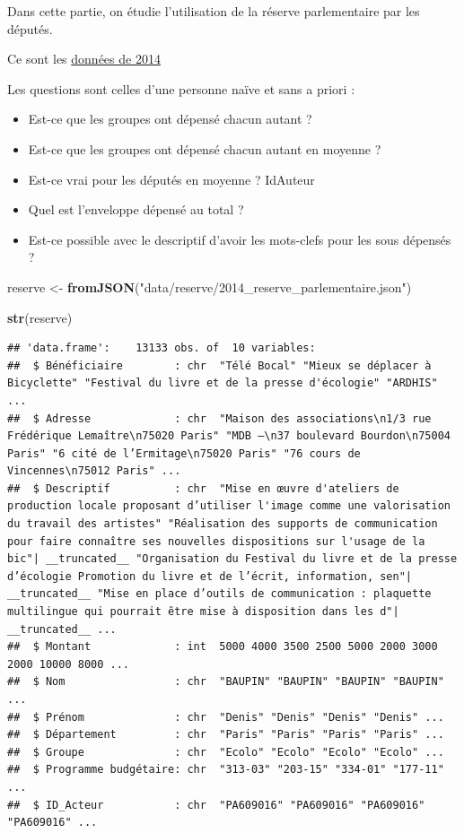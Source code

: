\documentclass[
]{book}
\newenvironment{Shaded}{\begin{snugshade}}{\end{snugshade}}
\newcommand{\FunctionTok}[1]{\textcolor[rgb]{0.13,0.29,0.53}{\textbf{#1}}}
\newcommand{\NormalTok}[1]{#1}
\newcommand{\OtherTok}[1]{\textcolor[rgb]{0.56,0.35,0.01}{#1}}
\newcommand{\StringTok}[1]{\textcolor[rgb]{0.31,0.60,0.02}{#1}}
\providecommand{\tightlist}{%
  \setlength{\itemsep}{0pt}\setlength{\parskip}{0pt}}
\begin{document}
Dans cette partie, on étudie l'utilisation de la réserve parlementaire par les
députés.

Ce sont les \href{https://www.data.gouv.fr/fr/datasets/reserve-parlementaire/}{données de 2014}

Les questions sont celles d'une personne naïve et sans a priori :

\begin{itemize}
\item
  Est-ce que les groupes ont dépensé chacun autant ?
\item
  Est-ce que les groupes ont dépensé chacun autant en moyenne ?
\item
  Est-ce vrai pour les députés en moyenne ? IdAuteur
\item
  Quel est l'enveloppe dépensé au total ?
\end{itemize}

\begin{itemize}
\tightlist
\item
  Est-ce possible avec le descriptif d'avoir les mots-clefs pour les sous dépensés ?
\end{itemize}

\begin{Shaded}
\begin{Highlighting}[]
\NormalTok{reserve }\OtherTok{\textless{}{-}} \FunctionTok{fromJSON}\NormalTok{(}\StringTok{"data/reserve/2014\_reserve\_parlementaire.json"}\NormalTok{)}

\FunctionTok{str}\NormalTok{(reserve)}
\end{Highlighting}
\end{Shaded}

\begin{verbatim}
## 'data.frame':    13133 obs. of  10 variables:
##  $ Bénéficiaire        : chr  "Télé Bocal" "Mieux se déplacer à Bicyclette" "Festival du livre et de la presse d'écologie" "ARDHIS" ...
##  $ Adresse             : chr  "Maison des associations\n1/3 rue Frédérique Lemaître\n75020 Paris" "MDB –\n37 boulevard Bourdon\n75004 Paris" "6 cité de l’Ermitage\n75020 Paris" "76 cours de Vincennes\n75012 Paris" ...
##  $ Descriptif          : chr  "Mise en œuvre d'ateliers de production locale proposant d’utiliser l'image comme une valorisation du travail des artistes" "Réalisation des supports de communication pour faire connaître ses nouvelles dispositions sur l'usage de la bic"| __truncated__ "Organisation du Festival du livre et de la presse d’écologie Promotion du livre et de l’écrit, information, sen"| __truncated__ "Mise en place d’outils de communication : plaquette multilingue qui pourrait être mise à disposition dans les d"| __truncated__ ...
##  $ Montant             : int  5000 4000 3500 2500 5000 2000 3000 2000 10000 8000 ...
##  $ Nom                 : chr  "BAUPIN" "BAUPIN" "BAUPIN" "BAUPIN" ...
##  $ Prénom              : chr  "Denis" "Denis" "Denis" "Denis" ...
##  $ Département         : chr  "Paris" "Paris" "Paris" "Paris" ...
##  $ Groupe              : chr  "Ecolo" "Ecolo" "Ecolo" "Ecolo" ...
##  $ Programme budgétaire: chr  "313-03" "203-15" "334-01" "177-11" ...
##  $ ID_Acteur           : chr  "PA609016" "PA609016" "PA609016" "PA609016" ...
\end{verbatim}
\end{document}
